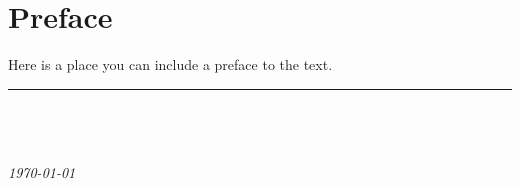 \chapter*{Preface} %

\begin{justify}
\small
{}
Here is a place you can include a preface to the text.
\blindtext

\end{justify}

\vspace{1cm}
\noindent
\begin{flushright}
	{\color{title}
	\rule{7cm}{0.02cm}
		\\	
	\itshape
	\myName
		\\
	\myLocation
		\\
	\selectfont \today
	}
\end{flushright}